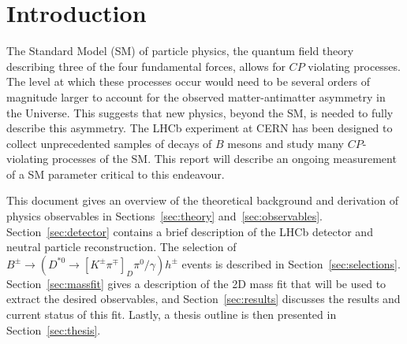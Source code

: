 \documentclass[oneside,12pt]{article}
\begin{document}
\section{\normalsize Introduction}
The Standard Model (SM) of particle physics, the quantum field theory describing
three of the four fundamental forces, allows for $CP$ violating processes. The
level at which these processes occur would need to be several orders of
magnitude larger to account for the observed matter-antimatter asymmetry in the
Universe. This suggests that new physics, beyond the SM, is needed to fully
describe this asymmetry. The LHCb experiment at CERN has been designed to
collect unprecedented samples of decays of $B$ mesons and study many
$CP$-violating processes of the SM. This report will describe an ongoing
measurement of a SM parameter critical to this endeavour.

This document gives an overview of the theoretical background and derivation of
physics observables in Sections~\ref{sec:theory} and~\ref{sec:observables}.
Section~\ref{sec:detector} contains a brief description of the LHCb detector and
neutral particle reconstruction. The selection of $B^{\pm}\rightarrow
(D^{*0}\rightarrow [K^{\pm}\pi^{\mp}]_D\pi^0/\gamma)h^{\pm}$ events is described
in Section~\ref{sec:selections}. Section~\ref{sec:massfit} gives a description
of the 2D mass fit that will be used to extract the desired observables, and
Section~\ref{sec:results} discusses the results and current status of this fit.
Lastly, a thesis outline is then presented in Section~\ref{sec:thesis}. 
\end{document}
